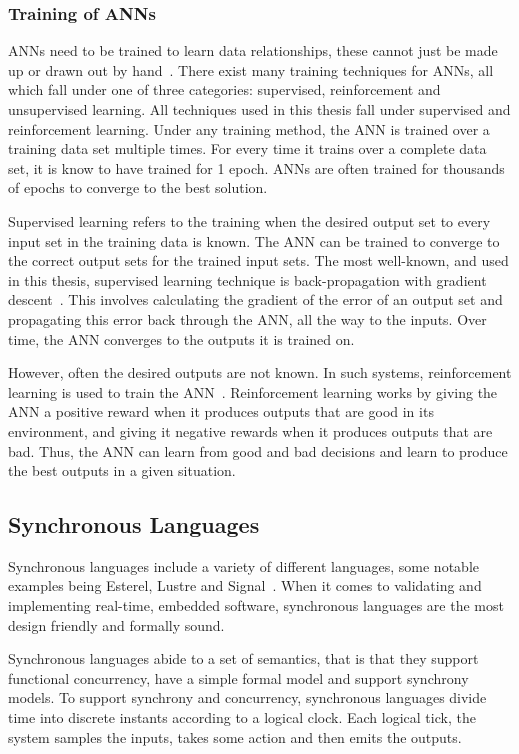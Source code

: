\subsubsection{Training of \acfp{ANN}}
\acp{ANN} need to be trained to learn data relationships, these cannot just be made up or drawn out by hand~\cite{ann-train}.
There exist many training techniques for \acp{ANN}, all which fall under one of three categories: supervised, reinforcement and unsupervised learning.
All techniques used in this thesis fall under supervised and reinforcement learning.
Under any training method, the \ac{ANN} is trained over a training data set multiple times. 
For every time it trains over a complete data set, it is know to have trained for 1 epoch.
\acp{ANN} are often trained for thousands of epochs to converge to the best solution.

Supervised learning refers to the training when the desired output set to every input set in the training data is known.
The \ac{ANN} can be trained to converge to the correct output sets for the trained input sets.
The most well-known, and used in this thesis, supervised learning technique is back-propagation with gradient descent~\cite{grad-desc}.
This involves calculating the gradient of the error of an output set and propagating this error back through the \ac{ANN}, all the way to the inputs.
Over time, the \ac{ANN} converges to the outputs it is trained on.

However, often the desired outputs are not known.
In such systems, reinforcement learning is used to train the \ac{ANN}~\cite{reinforcement-learning}.
Reinforcement learning works by giving the \ac{ANN} a positive reward when it produces outputs that are good in its environment, and giving it negative rewards when it produces outputs that are bad. 
Thus, the \ac{ANN} can learn from good and bad decisions and learn to produce the best outputs in a given situation.

\subsection{Synchronous Languages}
Synchronous languages include a variety of different languages, some notable examples being Esterel, Lustre and Signal~\cite{benveniste2003synchronous}.
When it comes to validating and implementing real-time, embedded software, synchronous languages are the most design friendly and formally sound.

Synchronous languages abide to a set of semantics, that is that they support functional concurrency, have a simple formal model and support synchrony models.
To support synchrony and concurrency, synchronous languages divide time into discrete instants according to a logical clock.
Each logical tick, the system samples the inputs, takes some action and then emits the outputs.

